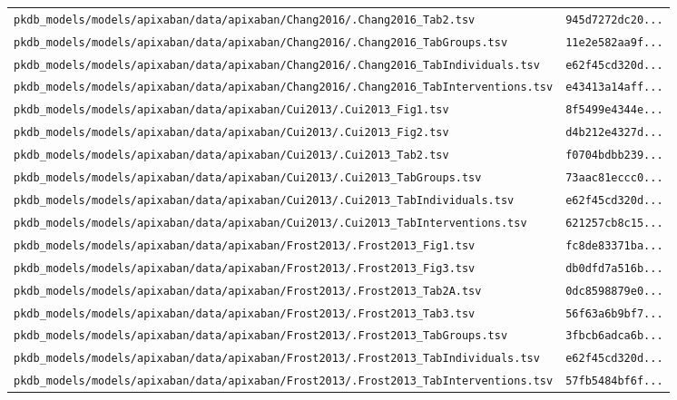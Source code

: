 \documentclass{article}
\begin{document}
\begin{longtable}{ll}
\texttt{pkdb\_models/models/apixaban/data/apixaban/Chang2016/.Chang2016\_Tab2.tsv} & \texttt{945d7272dc20...} \\
\texttt{pkdb\_models/models/apixaban/data/apixaban/Chang2016/.Chang2016\_TabGroups.tsv} & \texttt{11e2e582aa9f...} \\
\texttt{pkdb\_models/models/apixaban/data/apixaban/Chang2016/.Chang2016\_TabIndividuals.tsv} & \texttt{e62f45cd320d...} \\
\texttt{pkdb\_models/models/apixaban/data/apixaban/Chang2016/.Chang2016\_TabInterventions.tsv} & \texttt{e43413a14aff...} \\
\texttt{pkdb\_models/models/apixaban/data/apixaban/Cui2013/.Cui2013\_Fig1.tsv} & \texttt{8f5499e4344e...} \\
\texttt{pkdb\_models/models/apixaban/data/apixaban/Cui2013/.Cui2013\_Fig2.tsv} & \texttt{d4b212e4327d...} \\
\texttt{pkdb\_models/models/apixaban/data/apixaban/Cui2013/.Cui2013\_Tab2.tsv} & \texttt{f0704bdbb239...} \\
\texttt{pkdb\_models/models/apixaban/data/apixaban/Cui2013/.Cui2013\_TabGroups.tsv} & \texttt{73aac81eccc0...} \\
\texttt{pkdb\_models/models/apixaban/data/apixaban/Cui2013/.Cui2013\_TabIndividuals.tsv} & \texttt{e62f45cd320d...} \\
\texttt{pkdb\_models/models/apixaban/data/apixaban/Cui2013/.Cui2013\_TabInterventions.tsv} & \texttt{621257cb8c15...} \\
\texttt{pkdb\_models/models/apixaban/data/apixaban/Frost2013/.Frost2013\_Fig1.tsv} & \texttt{fc8de83371ba...} \\
\texttt{pkdb\_models/models/apixaban/data/apixaban/Frost2013/.Frost2013\_Fig3.tsv} & \texttt{db0dfd7a516b...} \\
\texttt{pkdb\_models/models/apixaban/data/apixaban/Frost2013/.Frost2013\_Tab2A.tsv} & \texttt{0dc8598879e0...} \\
\texttt{pkdb\_models/models/apixaban/data/apixaban/Frost2013/.Frost2013\_Tab3.tsv} & \texttt{56f63a6b9bf7...} \\
\texttt{pkdb\_models/models/apixaban/data/apixaban/Frost2013/.Frost2013\_TabGroups.tsv} & \texttt{3fbcb6adca6b...} \\
\texttt{pkdb\_models/models/apixaban/data/apixaban/Frost2013/.Frost2013\_TabIndividuals.tsv} & \texttt{e62f45cd320d...} \\
\texttt{pkdb\_models/models/apixaban/data/apixaban/Frost2013/.Frost2013\_TabInterventions.tsv} & \texttt{57fb5484bf6f...} \\

\end{longtable}
\end{document}

